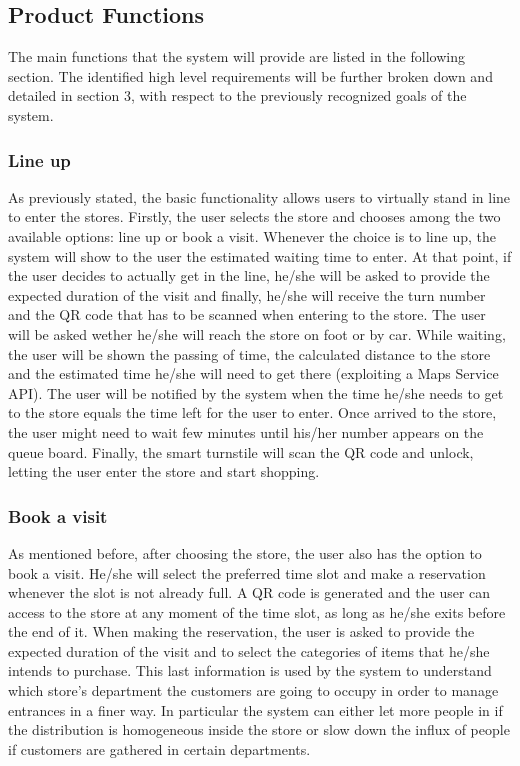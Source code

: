 \documentclass{article}
\begin{document}
\subsection{Product Functions}
The main functions that the system will provide are listed in the following section. The identified high level requirements will be further broken down and detailed in section 3, with respect to the previously recognized goals of the system.
\subsubsection{Line up} 
As previously stated, the basic functionality allows users to virtually stand in line to enter the stores. Firstly, the user selects the store and chooses among the two available options: line up or book a visit. Whenever the choice is to line up, the system will show to the user the estimated waiting time to enter. At that point, if the user decides to actually get in the line, he/she will be asked to provide the expected duration of the visit and finally, he/she will receive the turn number and the QR code that has to be scanned when entering to the store. The user will be asked wether he/she will reach the store on foot or by car. While waiting, the user will be shown the passing of time, the calculated distance to the store and the estimated time he/she will need to get there (exploiting a Maps Service API). The user will be notified by the system when the time he/she needs to get to the store equals the time left for the user to enter. Once arrived to the store, the user might need to wait few minutes until his/her number appears on the queue board. Finally, the smart turnstile will scan the QR code and unlock, letting the user enter the store and start shopping.
\subsubsection{Book a visit} 
As mentioned before, after choosing the store, the user also has the option to book a visit. He/she will select the preferred time slot and make a reservation whenever the slot is not already full. A QR code is generated and the user can access to the store at any moment of the time slot, as long as he/she exits before the end of it. When making the reservation, the user is asked to provide the expected duration of the visit and to select the categories of items that he/she intends to purchase. This last information is used by the system to understand which store’s department the customers are going to occupy in order to manage entrances in a finer way. In particular the system can either let more people in if the distribution is homogeneous inside the store or slow down the influx of people if customers are gathered in certain departments.
\end{document}
